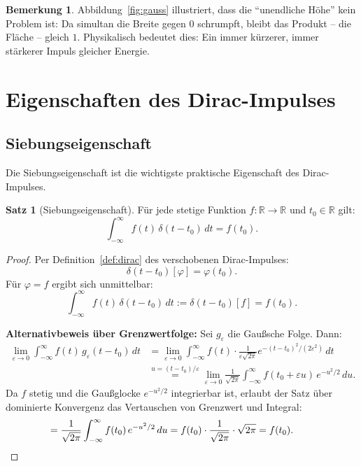 ﻿\documentclass[a4paper,12pt]{article}
\theoremstyle{definition}
\newtheorem{satz}{Satz}
\newtheorem{bemerkung}{Bemerkung}
\begin{document}
\begin{bemerkung}
Abbildung~\ref{fig:gauss} illustriert, dass die ``unendliche H\"ohe'' kein Problem ist:
Da simultan die Breite gegen $0$ schrumpft, bleibt das Produkt -- die Fl\"ache -- gleich $1$.
Physikalisch bedeutet dies: Ein immer k\"urzerer, immer st\"arkerer Impuls gleicher Energie.
\end{bemerkung}

\section{Eigenschaften des Dirac-Impulses}
\label{sec:eigenschaften}

\subsection{Siebungseigenschaft}

Die Siebungseigenschaft ist die wichtigste praktische Eigenschaft des Dirac-Impulses.

\begin{satz}[Siebungseigenschaft]
\label{satz:siebung}
F\"ur jede stetige Funktion $f: \mathbb{R} \to \mathbb{R}$ und $t_0 \in \mathbb{R}$ gilt:
\[
\int_{-\infty}^{\infty} f(t)\,\delta(t - t_0)\,dt = f(t_0).
\]
\end{satz}

\begin{proof}
Per Definition~\ref{def:dirac} des verschobenen Dirac-Impulses:
\[
\delta(t - t_0)[\varphi] = \varphi(t_0).
\]
F\"ur $\varphi = f$ ergibt sich unmittelbar:
\[
\int_{-\infty}^{\infty} f(t)\,\delta(t - t_0)\,dt
:= \delta(t - t_0)[f] = f(t_0).
\]

\textbf{Alternativbeweis \"uber Grenzwertfolge:} Sei $g_\varepsilon$ die Gau{\ss}sche Folge. Dann:
\begin{align*}
\lim_{\varepsilon \to 0} \int_{-\infty}^{\infty} f(t)\,g_\varepsilon(t - t_0)\,dt
&= \lim_{\varepsilon \to 0} \int_{-\infty}^{\infty} f(t)
   \cdot \frac{1}{\varepsilon\sqrt{2\pi}}e^{-(t-t_0)^2/(2\varepsilon^2)}\,dt \\
&\stackrel{u=(t-t_0)/\varepsilon}{=}
   \lim_{\varepsilon \to 0} \frac{1}{\sqrt{2\pi}}
   \int_{-\infty}^{\infty} f(t_0 + \varepsilon u)\,e^{-u^2/2}\,du.
\end{align*}
Da $f$ stetig und die Gau{\ss}glocke $e^{-u^2/2}$ integrierbar ist, erlaubt der
Satz \"uber dominierte Konvergenz das Vertauschen von Grenzwert und Integral:
\[
= \frac{1}{\sqrt{2\pi}} \int_{-\infty}^{\infty} f(t_0)\,e^{-u^2/2}\,du
= f(t_0) \cdot \frac{1}{\sqrt{2\pi}} \cdot \sqrt{2\pi} = f(t_0). \qquad \qedhere
\]
\end{proof}
\end{document}
